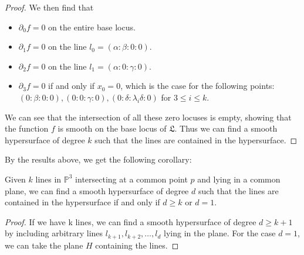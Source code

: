 \begin{proof}
    We then find that 
    \begin{itemize}
        \item $\partial_0 f = 0$ on the entire base locus.
        \item $\partial_1 f = 0$ on the line $l_0 = (\alpha : \beta : 0 : 0)$.
        \item $\partial_2 f = 0$ on the line $l_1 = (\alpha : 0 : \gamma : 0)$.
        \item $\partial_3 f = 0$ if and only if $x_0 = 0$, which is the case for the following points: $(0 : \beta : 0 : 0), (0 : 0 : \gamma : 0), (0 : \delta : \lambda_i \delta : 0)$ for $3 \leq i \leq k$.  
    \end{itemize}
    We can see that the intersection of all these zero locuses is empty, showing that the function $f$ is smooth on the base locus of $\mathfrak{L}$.
    Thus we can find a smooth hypersurface of degree $k$ such that the lines are contained in the hypersurface.
    
\end{proof}

By the results above, we get the following corollary:
\begin{corollary}
Given $k$ lines in $\mathbb{P}^3$ intersecting at a common point $p$ and lying in a common plane, we can find a smooth hypersurface of degree $d$ such that the lines are contained in the hypersurface if and only if $d \geq k$ or $d=1$.
\end{corollary}
\begin{proof}
    If we have k lines, we can find a smooth hypersurface of degree $d \geq k+1$ by including arbitrary lines $l_{k+1}, l_{k+2}, \dots, l_d$ lying in the plane. For the case $d=1$, we can take the plane $H$ containing the lines.
\end{proof}